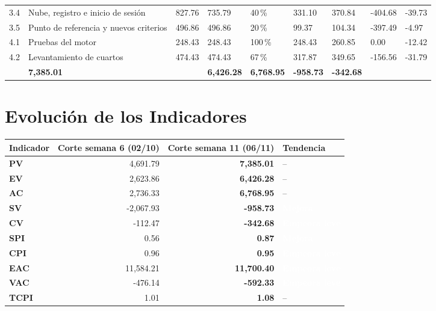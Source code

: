 \documentclass[11pt,a4paper]{article}
\newcommand{\etiqueta}[2]{{\setlength{\fboxsep}{2pt}\colorbox{#1}{\textcolor{white}{\scriptsize\bfseries #2}}}}
\begin{document}
{\begin{tabularx}{\textwidth}{@{}C{0.7cm} L Q{1.4cm} Q{1.35cm} C{0.9cm} Q{1.35cm} Q{1.35cm} Q{1.4cm} Q{1.2cm}@{}}
3.4 & Nube, registro e inicio de sesión & 827.76 & 735.79 & 40\,\% & 331.10 & 370.84 & \textcolor{SevAlta}{-404.68} & \textcolor{SevAlta}{-39.73} \\
3.5 & Punto de referencia y nuevos criterios & 496.86 & 496.86 & 20\,\% & 99.37 & 104.34 & \textcolor{SevAlta}{-397.49} & \textcolor{SevAlta}{-4.97} \\
4.1 & Pruebas del motor & 248.43 & 248.43 & 100\,\% & 248.43 & 260.85 & 0.00 & \textcolor{SevAlta}{-12.42} \\
4.2 & Levantamiento de cuartos & 474.43 & 474.43 & 67\,\% & 317.87 & 349.65 & \textcolor{SevAlta}{-156.56} & \textcolor{SevAlta}{-31.79} \\
\midrule
{} & \textbf{7,385.01} & & \textbf{6,426.28} & \textbf{6,768.95} & \textbf{\textcolor{SevAlta}{-958.73}} & \textbf{\textcolor{SevAlta}{-342.68}} \\
\bottomrule
\end{tabularx}
}

\section{Evolución de los Indicadores}
{\small
{}
\noindent\begin{tabularx}{\textwidth}{@{}C{1.7cm} R R C{2.4cm}@{}}
\toprule
{}
\textbf{Indicador} & \textbf{Corte semana 6 (02/10)} & \textbf{Corte semana 11 (06/11)} & \textbf{Tendencia} \\
\midrule
\textbf{PV} & 4,691.79 & \textbf{7,385.01} & -- \\
\textbf{EV} & 2,623.86 & \textbf{6,426.28} & -- \\
\textbf{AC} & 2,736.33 & \textbf{6,768.95} & -- \\
\textbf{SV} & -2,067.93 & \textbf{-958.73} & \etiqueta{Rama4}{Mejora} \\
\textbf{CV} & -112.47 & \textbf{-342.68} & \etiqueta{SevMedia}{Empeora leve} \\
\textbf{SPI} & 0.56 & \textbf{0.87} & \etiqueta{Rama4}{Mejora} \\
\textbf{CPI} & 0.96 & \textbf{0.95} & \etiqueta{SevMedia}{Empeora leve} \\
\textbf{EAC} & 11,584.21 & \textbf{11,700.40} & \etiqueta{SevMedia}{Empeora leve} \\
\textbf{VAC} & -476.14 & \textbf{-592.33} & \etiqueta{SevMedia}{Empeora leve} \\
\textbf{TCPI} & 1.01 & \textbf{1.08} & -- \\
\bottomrule
\end{tabularx}
}
\end{document}
